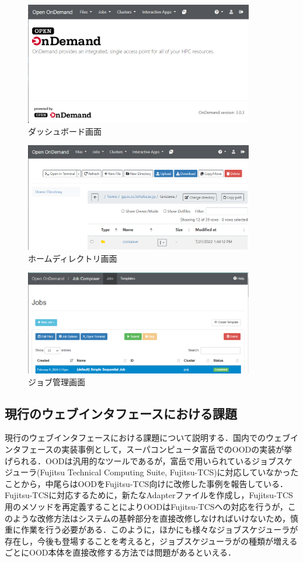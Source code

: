 \begin{figure}[tb]
    \centering
    \includegraphics[width=100mm]{./fig/dashboard.png}
    \caption{ダッシュボード画面}
    \label{fig1}
\end{figure}

\begin{figure}[tb]
    \centering
    \includegraphics[width=100mm]{./fig/homedirectory.png}
    \caption{ホームディレクトリ画面}
    \label{fig2}
\end{figure}

\begin{figure}[tb]
    \centering
    \includegraphics[width=100mm]{./fig/jobcomposer.png}
    \caption{ジョブ管理画面}
    \label{fig3}
\end{figure}

\subsection{現行のウェブインタフェースにおける課題}
現行のウェブインタフェースにおける課題について説明する．国内でのウェブインタフェースの実装事例として，スーパコンピュータ富岳でのOODの実装が挙げられる．OODは汎用的なツールであるが，富岳で用いられているジョブスケジューラ(Fujitsu Technical Computing Suite, Fujitsu-TCS)に対応していなかったことから，中尾らはOODをFujitsu-TCS向けに改修した事例を報告している\cite{cite4}．Fujitsu-TCSに対応するために，新たなAdapterファイルを作成し，Fujitsu-TCS用のメソッドを再定義することによりOODはFujitsu-TCSへの対応を行うが，このような改修方法はシステムの基幹部分を直接改修しなければいけないため，慎重に作業を行う必要がある．このように，ほかにも様々なジョブスケジューラが存在し，今後も登場することを考えると，ジョブスケジューラがの種類が増えるごとにOOD本体を直接改修する方法では問題があるといえる．\par


